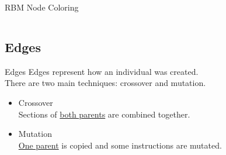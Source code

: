 \documentclass{beamer}
\begin{document}
\begin{frame}{RBM Node Coloring}
\begin{columns}
\begin{column}{.6\textwidth}
\end{column}
\end{columns}
\end{frame}

\subsection[Edges]{Edges}

\begin{frame}{Edges}
Edges represent how an individual was created. \\
There are two main techniques: crossover and mutation.
\begin{itemize}
\item Crossover \\ Sections of \underline{both parents} are combined together. 
\item Mutation \\ \underline{One parent} is copied and some instructions are mutated.
\end{itemize} 
\end{frame}
\end{document}

